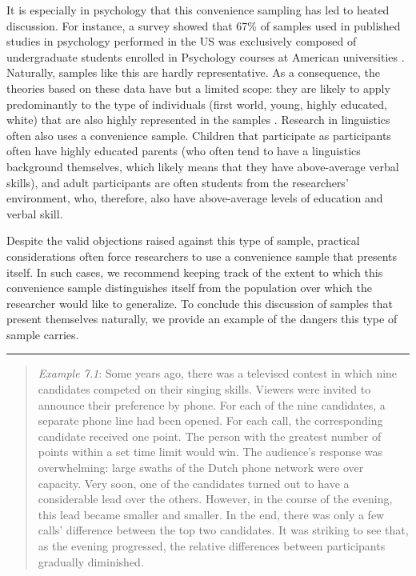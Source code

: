 \documentclass[
]{book}
\begin{document}
It is especially in psychology that this convenience sampling has led to heated discussion. For instance, a survey showed that 67\% of samples used in published studies in psychology performed in the US was exclusively composed of undergraduate students enrolled in Psychology courses at American universities \citep{Henr10}. Naturally, samples like this are hardly representative. As a consequence, the theories based on these data have but a limited scope: they are likely to apply predominantly to the type of individuals (first world, young, highly educated, white) that are also highly represented in the samples \citep{Henr10}. Research in linguistics often also uses a convenience sample. Children that participate as participants often have highly educated parents (who often tend to have a linguistics background themselves, which likely means that they have above-average verbal skills), and adult participants are often students from the researchers' environment, who, therefore, also have above-average levels of education and verbal skill.

Despite the valid objections raised against this type of sample, practical considerations often force researchers to use a convenience sample that presents itself. In such cases, we recommend keeping track of the extent to which this convenience sample distinguishes itself from the population over which the researcher would like to generalize. To conclude this discussion of samples that present themselves naturally, we provide an example of the dangers this type of sample carries.

\begin{center}\rule{0.5\linewidth}{0.5pt}\end{center}

\begin{quote}
\emph{Example 7.1}: Some years ago, there was a televised contest in which nine candidates competed on their singing skills. Viewers were invited to announce their preference by phone. For each of the nine candidates, a separate phone line had been opened. For each call, the corresponding candidate received one point. The person with the greatest number of points within a set time limit would win. The audience's response was overwhelming: large swaths of the Dutch phone network were over capacity. Very soon, one of the candidates turned out to have a considerable lead over the others. However, in the course of the evening, this lead became smaller and smaller. In the end, there was only a few calls' difference between the top two candidates. It was striking to see that, as the evening progressed, the relative differences between participants gradually diminished.
\end{quote}
\end{document}
